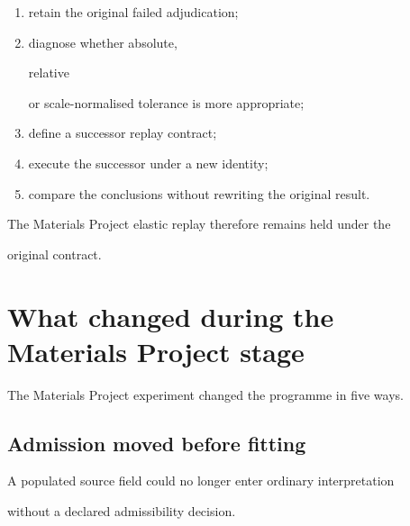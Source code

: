 \documentclass[11pt,a4paper,oneside]{report}
\begin{document}
\begin{enumerate}



\item

retain the original failed adjudication;



\item

diagnose whether absolute,

relative

or scale-normalised tolerance is more appropriate;



\item

define a successor replay contract;



\item

execute the successor under a new identity;



\item

compare the conclusions without rewriting the original result.



\end{enumerate}



The Materials Project elastic replay therefore remains held under the

original contract.





\section{What changed during the Materials Project stage}



The Materials Project experiment changed the programme in five ways.



\subsection{Admission moved before fitting}



A populated source field could no longer enter ordinary interpretation

without a declared admissibility decision.
\end{document}
